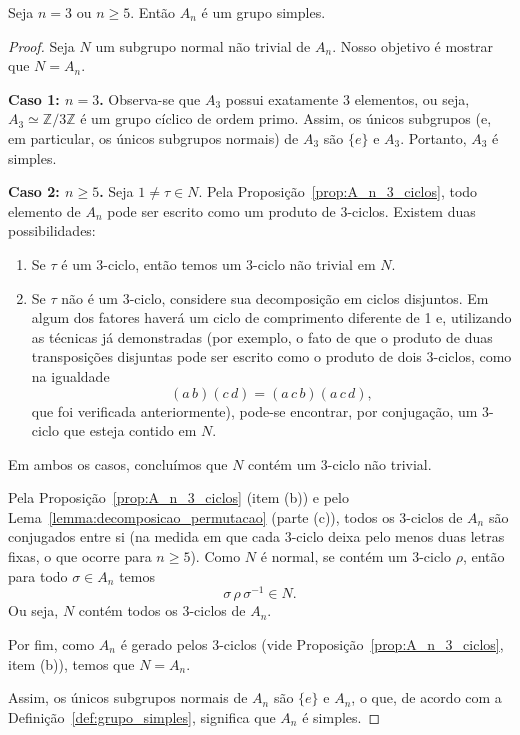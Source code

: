 \documentclass[11pt,openany]{book}
\begin{document}
\begin{theorem}
\label{theo:grupo_alternado_simples}
    Seja $n=3$ ou $n \geq 5$. Então $A_n$ é um grupo simples.
\end{theorem}
\begin{proof}
    Seja \(N\) um subgrupo normal não trivial de \(A_n\). Nosso objetivo é mostrar que \(N = A_n\).

    \medskip

    \textbf{Caso 1: \(n=3\).}  
    Observa-se que \(A_3\) possui exatamente 3 elementos, ou seja, \(A_3 \simeq \mathbb{Z}/3\mathbb{Z}\) é um grupo cíclico de ordem primo. Assim, os únicos subgrupos (e, em particular, os únicos subgrupos normais) de \(A_3\) são \(\{e\}\) e \(A_3\). Portanto, \(A_3\) é simples.

    \medskip

    \textbf{Caso 2: \(n\geq 5\).}  
    Seja \(1\neq \tau\in N\). Pela Proposição~\ref{prop:A_n_3_ciclos}, todo elemento de \(A_n\) pode ser escrito como um produto de \(3\)-ciclos. Existem duas possibilidades:

    \begin{enumerate}[label=\textbf{(\alph*)}]
        \item Se \(\tau\) é um \(3\)-ciclo, então temos um \(3\)-ciclo não trivial em \(N\).  
        \item Se \(\tau\) não é um \(3\)-ciclo, considere sua decomposição em ciclos disjuntos. Em algum dos fatores haverá um ciclo de comprimento diferente de 1 e, utilizando as técnicas já demonstradas (por exemplo, o fato de que o produto de duas transposições disjuntas pode ser escrito como o produto de dois \(3\)-ciclos, como na igualdade
        \[
        (a\,b)(c\,d) = (a\,c\,b)(a\,c\,d),
        \]
        que foi verificada anteriormente), pode-se encontrar, por conjugação, um \(3\)-ciclo que esteja contido em \(N\).  
    \end{enumerate}

    Em ambos os casos, concluímos que \(N\) contém um \(3\)-ciclo não trivial.

    Pela Proposição~\ref{prop:A_n_3_ciclos} (item (b)) e pelo Lema~\ref{lemma:decomposicao_permutacao} (parte (c)), todos os \(3\)-ciclos de \(A_n\) são conjugados entre si (na medida em que cada \(3\)-ciclo deixa pelo menos duas letras fixas, o que ocorre para \(n\ge5\)). Como \(N\) é normal, se contém um \(3\)-ciclo \(\rho\), então para todo \(\sigma\in A_n\) temos
    \[
    \sigma\,\rho\,\sigma^{-1} \in N.
    \]
    Ou seja, \(N\) contém todos os \(3\)-ciclos de \(A_n\).

    Por fim, como \(A_n\) é gerado pelos \(3\)-ciclos (vide Proposição~\ref{prop:A_n_3_ciclos}, item (b)), temos que \(N = A_n\).

    \medskip

    Assim, os únicos subgrupos normais de \(A_n\) são \(\{e\}\) e \(A_n\), o que, de acordo com a Definição~\ref{def:grupo_simples}, significa que \(A_n\) é simples.
\end{proof}
\end{document}
